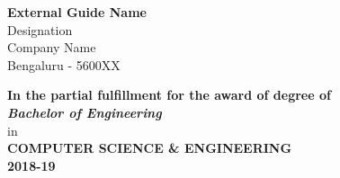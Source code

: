 \begin{center}
\begin{multicols}{2}
		\normalsize \textbf{External Guide Name}\\
		\normalsize Designation\\
		\normalsize Company Name\\
		\normalsize Bengaluru - 5600XX\\

	\end{multicols}

	\bigskip
	\medskip

	\normalsize \textbf {In the partial fulfillment for the award of degree of}\\
	\normalsize \textbf {\textit{Bachelor of Engineering}}\\ in \\
	\normalsize \textbf {COMPUTER SCIENCE \& ENGINEERING \\ 2018-19}

\end{center}



\newpage


